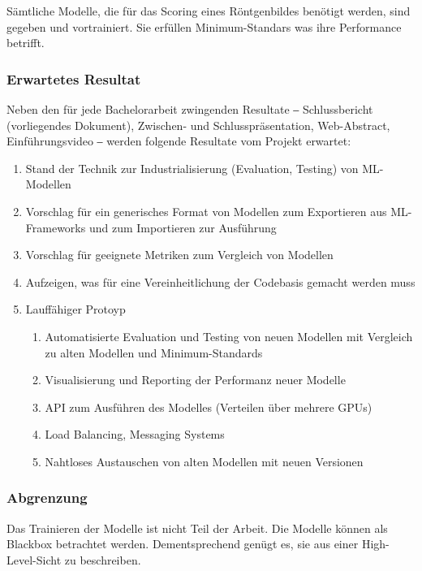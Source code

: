 Sämtliche Modelle, die für das Scoring eines Röntgenbildes benötigt werden, sind gegeben und vortrainiert. Sie erfüllen Minimum-Standars was ihre Performance betrifft.

\subsubsection{Erwartetes Resultat}
\label{sec:erwartetes-resultat}

Neben den für jede Bachelorarbeit zwingenden Resultate ‒ Schlussbericht (vorliegendes Dokument), Zwischen- und Schlusspräsentation, Web-Abstract, Einführungsvideo ‒ werden folgende Resultate vom Projekt erwartet:

\begin{enumerate}
    \item Stand der Technik zur Industrialisierung (Evaluation, Testing) von ML-Modellen
    \item Vorschlag für ein generisches Format von Modellen zum Exportieren aus ML-Frame\-works und zum Importieren zur Ausführung
    \item Vorschlag für geeignete Metriken zum Vergleich von Modellen
    \item Aufzeigen, was für eine Vereinheitlichung der Codebasis gemacht werden muss
    \item Lauffähiger Protoyp
    \begin{enumerate}
        \item Automatisierte Evaluation und Testing von neuen Modellen mit Vergleich zu alten Modellen und Minimum-Standards
        \item Visualisierung und Reporting der Performanz neuer Modelle
        \item API zum Ausführen des Modelles (Verteilen über mehrere GPUs)
        \item Load Balancing, Messaging Systems
        \item Nahtloses Austauschen von alten Modellen mit neuen Versionen
    \end{enumerate}
\end{enumerate}

\subsubsection{Abgrenzung}

Das Trainieren der Modelle ist nicht Teil der Arbeit. Die Modelle können als Blackbox betrachtet werden. Dementsprechend genügt es, sie aus einer High-Level-Sicht zu beschreiben.

